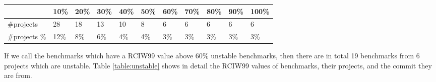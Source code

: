 \documentclass{seal_thesis}
\begin{document}
\begin{table}[H]
\begin{tabular}{lllllllllll}
		\rowcolor[HTML]{FFCCC9} 
		\multicolumn{1}{|l|}{\cellcolor[HTML]{FFCCC9}Percentage} & \multicolumn{1}{l|}{\cellcolor[HTML]{FFCCC9}10\%} & \multicolumn{1}{l|}{\cellcolor[HTML]{FFCCC9}20\%} & \multicolumn{1}{l|}{\cellcolor[HTML]{FFCCC9}30\%} & \multicolumn{1}{l|}{\cellcolor[HTML]{FFCCC9}40\%} & \multicolumn{1}{l|}{\cellcolor[HTML]{FFCCC9}50\%} & \multicolumn{1}{l|}{\cellcolor[HTML]{FFCCC9}60\%} & \multicolumn{1}{l|}{\cellcolor[HTML]{FFCCC9}70\%} & \multicolumn{1}{l|}{\cellcolor[HTML]{FFCCC9}80\%} & \multicolumn{1}{l|}{\cellcolor[HTML]{FFCCC9}90\%} & \multicolumn{1}{l|}{\cellcolor[HTML]{FFCCC9}100\%} \\ \hline
		\multicolumn{1}{|l|}{\#projects}                         & \multicolumn{1}{l|}{28}                           & \multicolumn{1}{l|}{18}                           & \multicolumn{1}{l|}{13}                           & \multicolumn{1}{l|}{10}                           & \multicolumn{1}{l|}{8}                            & \multicolumn{1}{l|}{6}                            & \multicolumn{1}{l|}{6}                            & \multicolumn{1}{l|}{6}                            & \multicolumn{1}{l|}{6}                            & \multicolumn{1}{l|}{6}                             \\ \hline
		\multicolumn{1}{|l|}{\#projects \%}                      & \multicolumn{1}{l|}{12\%}                         & \multicolumn{1}{l|}{8\%}                          & \multicolumn{1}{l|}{6\%}                          & \multicolumn{1}{l|}{4\%}                          & \multicolumn{1}{l|}{4\%}                          & \multicolumn{1}{l|}{3\%}                          & \multicolumn{1}{l|}{3\%}                          & \multicolumn{1}{l|}{3\%}                          & \multicolumn{1}{l|}{3\%}                          & \multicolumn{1}{l|}{3\%}                           \\ \hline
	\end{tabular}
\end{table}

\noindent If we call the benchmarks which have a RCIW99 value above 60\% unstable benchmarks, then there are in total 19 benchmarks from 6 projects which are unstable. Table \ref{table:unstable} shows in detail the RCIW99 values of benchmarks, their projects, and the commit they are from.
\end{document}
